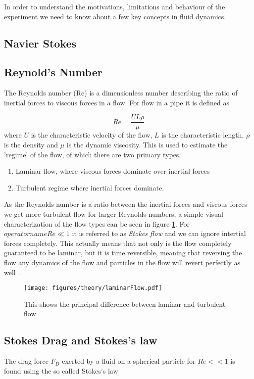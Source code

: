 
In order to understand the motivations, limitations and behaviour of the experiment we need to know about a few key concepts in fluid dynamics.

\subsection{Navier Stokes}


\subsection{Reynold's Number}
The Reynolds number (Re) is a dimensionless number describing the ratio of inertial forces to viscous forces in a flow. For flow in a pipe it is defined as \cite{introfluid}

\begin{equation}\label{eq:reynolds}
Re = \frac{U L \rho}{\mu}
\end{equation}
where $U$ is the characteristic velocity of the flow, $L$ is the characteristic length, $\rho$ is the density and $\mu$ is the dynamic viscosity. This is used to estimate the 'regime' of the flow, of which there are two primary types. 
\begin{enumerate}
\item Laminar flow, where viscous forces dominate over inertial forces
\item Turbulent regime where inertial forces dominate.
\end{enumerate}

As the Reynolds number is a ratio between the inertial forces and viscous forces we get more turbulent flow for larger Reynolds numbers, a simple visual characterization of the flow types can be seen in figure \ref{fig:laminar_flow}. For $operatorname{Re}\ll 1$ it is referred to as \emph{Stokes flow} and we can ignore intertial forces completely. This actually means that not only is the flow completely guaranteed to be laminar, but it is time reversible, meaning that reversing the flow any dynamics of the flow and particles in the flow will revert perfectly as well \cite{introfluid3}.

\begin{figure}[H]
\centering
\texttt{[image: figures/theory/laminarFlow.pdf]}
\caption{This shows the principal difference between laminar and turbulent flow}
\label{fig:laminar_flow}
\end{figure}


\subsection{Stokes Drag and Stokes's law}
The drag force $F_D$ exerted by a fluid on a spherical particle for $Re << 1$ is found using the so called Stokes's law \cite{introfluid2}

